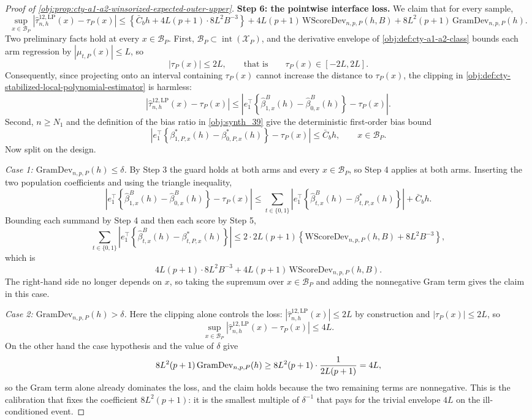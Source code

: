 \documentclass[11pt]{article}
\begin{document}
\begin{proof}[Proof of \cref{obj:prop:cty-a1-a2-winsorized-expected-outer-upper}]
\textbf{Step 6: the pointwise interface loss.}  We claim that for every sample,
\[
\sup_{x\in\mathcal B_P}
\left|\widehat\tau^{12,\mathrm{LP}}_{n,h}(x)-\tau_P(x)\right|
\leq
\left\{\bar C_bh+4L(p+1)\cdot8L^2B^{-3}\right\}
+
4L(p+1)\,\mathrm{WScoreDev}_{n,p,P}(h,B)
+
8L^2(p+1)\,\mathrm{GramDev}_{n,p,P}(h) .
\]
Two preliminary facts hold at every \(x\in\mathcal B_P\).  First, \(\mathcal B_P\subset\operatorname{int}(\mathcal X_P)\), and the derivative envelope of \cref{obj:def:cty-a1-a2-class} bounds each arm regression by \(|\mu_{t,P}(x)|\leq L\), so
\[
|\tau_P(x)|\leq2L,
\qquad\text{that is}\qquad
\tau_P(x)\in[-2L,2L] .
\]
Consequently, since projecting onto an interval containing \(\tau_P(x)\) cannot increase the distance to \(\tau_P(x)\), the clipping in \cref{obj:def:cty-stabilized-local-polynomial-estimator} is harmless:
\[
\left|\widehat\tau^{12,\mathrm{LP}}_{n,h}(x)-\tau_P(x)\right|
\leq
\left|e_1^\top\left\{\widehat\beta^B_{1,x}(h)-\widehat\beta^B_{0,x}(h)\right\}-\tau_P(x)\right| .
\]
Second, \(n\geq N_1\) and the definition of the bias ratio in \cref{obj:synth_39} give the deterministic first-order bias bound
\[
\left|e_1^\top\left\{\beta^*_{1,P,x}(h)-\beta^*_{0,P,x}(h)\right\}-\tau_P(x)\right|
\leq
\bar C_bh,
\qquad x\in\mathcal B_P .
\]
Now split on the design.

\emph{Case 1: \(\mathrm{GramDev}_{n,p,P}(h)\leq\delta\).}  By Step 3 the guard holds at both arms and every \(x\in\mathcal B_P\), so Step 4 applies at both arms.  Inserting the two population coefficients and using the triangle inequality,
\[
\left|e_1^\top\left\{\widehat\beta^B_{1,x}(h)-\widehat\beta^B_{0,x}(h)\right\}-\tau_P(x)\right|
\leq
\sum_{t\in\{0,1\}}
\left|e_1^\top\left\{\widehat\beta^B_{t,x}(h)-\beta^*_{t,P,x}(h)\right\}\right|
+
\bar C_bh .
\]
Bounding each summand by Step 4 and then each score by Step 5,
\[
\sum_{t\in\{0,1\}}
\left|e_1^\top\left\{\widehat\beta^B_{t,x}(h)-\beta^*_{t,P,x}(h)\right\}\right|
\leq
2\cdot2L(p+1)\left\{\mathrm{WScoreDev}_{n,p,P}(h,B)+8L^2B^{-3}\right\} ,
\]
which is
\[
4L(p+1)\cdot8L^2B^{-3}
+
4L(p+1)\,\mathrm{WScoreDev}_{n,p,P}(h,B) .
\]
The right-hand side no longer depends on \(x\), so taking the supremum over \(x\in\mathcal B_P\) and adding the nonnegative Gram term gives the claim in this case.

\emph{Case 2: \(\mathrm{GramDev}_{n,p,P}(h)>\delta\).}  Here the clipping alone controls the loss: \(|\widehat\tau^{12,\mathrm{LP}}_{n,h}(x)|\leq2L\) by construction and \(|\tau_P(x)|\leq2L\), so
\[
\sup_{x\in\mathcal B_P}\left|\widehat\tau^{12,\mathrm{LP}}_{n,h}(x)-\tau_P(x)\right|\leq4L .
\]
On the other hand the case hypothesis and the value of \(\delta\) give
\[
8L^2(p+1)\,\mathrm{GramDev}_{n,p,P}(h)
\geq
8L^2(p+1)\cdot{1\over2L(p+1)}
=
4L ,
\]
so the Gram term alone already dominates the loss, and the claim holds because the two remaining terms are nonnegative.  This is the calibration that fixes the coefficient \(8L^2(p+1)\): it is the smallest multiple of \(\delta^{-1}\) that pays for the trivial envelope \(4L\) on the ill-conditioned event.


\end{proof}
\end{document}
